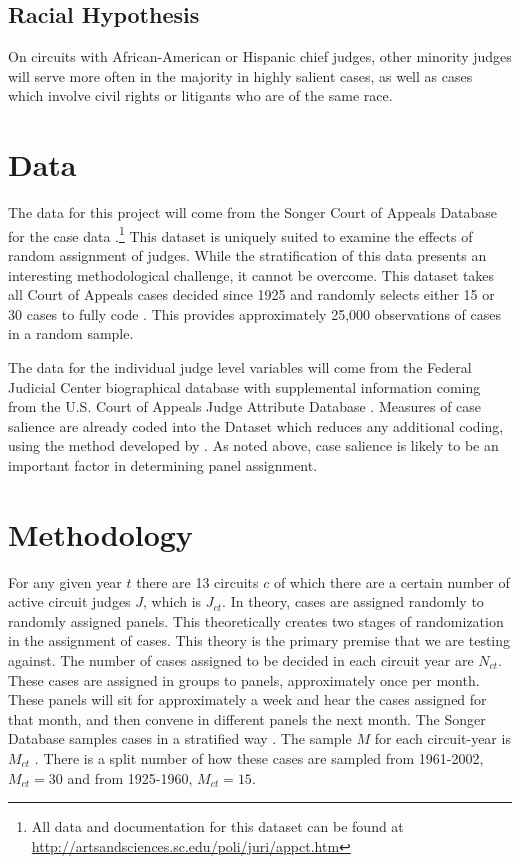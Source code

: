 \documentclass[12pt]{article}
\begin{document}
\subsection*{Racial Hypothesis}
On circuits with African-American or Hispanic chief judges, other minority judges will serve more often in the majority in highly salient cases, as well as cases which involve civil rights or litigants who are of the same race.

\section{Data}\label{Data}
The data for this project will come from the Songer Court of Appeals Database for the case data \citep{Songer2007}.\footnote{All data and documentation for this dataset can be found at \url{http://artsandsciences.sc.edu/poli/juri/appct.htm}}  This dataset is uniquely suited to examine the effects of random assignment of judges.  While the stratification of this data presents an interesting methodological challenge, it cannot be overcome.  This dataset takes all Court of Appeals cases decided since 1925 and randomly selects either 15 or 30 cases to fully code \citep{hurwitz2006institutional,hurtwitz2012changes}.  This provides approximately 25,000 observations of cases in a random sample.   

The data for the individual judge level variables will come from the Federal Judicial Center biographical database with supplemental information coming from the U.S. Court of Appeals Judge Attribute Database \citep{FJC}. Measures of case salience are already coded into the \citeauthor{Songer2007} Dataset which reduces any additional coding, using the method developed by \cite{Hettinger2003}.  As noted above, case salience is likely to be an important factor in determining panel assignment.

\section{Methodology}\label{Methods}
For any given year $t$ there are 13 circuits $c$ of which there are a certain number of active circuit judges $J$, which is $J_{ct}$.  In theory, cases are assigned randomly to randomly assigned panels.  This theoretically creates two stages of randomization in the assignment of cases.  This theory is the primary premise that we are testing against.  The number of cases assigned to be decided in each circuit year are $N_{ct}$.  These cases are assigned in groups to panels, approximately once per month.  These panels will sit for approximately a week and hear the cases assigned for that month, and then convene in different panels the next month.  The Songer Database samples cases in a stratified way \citep{Songer2007}.  The sample $M$ for each circuit-year is $M_{ct}$ \citep{Songer2007}.  There is a split number of how these cases are sampled from 1961-2002, $M_{ct}=30$ and from 1925-1960, $M_{ct}=15$.  
\end{document}
